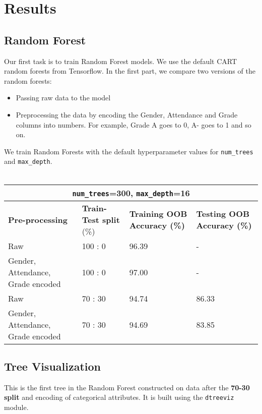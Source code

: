\section{Results}
\subsection{Random Forest}
Our first task is to train Random Forest models. We use the default CART random forests from Tensorflow. In the first part, we compare two versions of the random forests:

\begin{itemize}
    \item Passing raw data to the model
    \item Preprocessing the data by encoding the Gender, Attendance and Grade columns into numbers. For example, Grade A goes to 0, A- goes to 1 and so on.
\end{itemize}


We train Random Forests with the default hyperparameter values for \texttt{num\_trees} and \texttt{max\_depth}.\\\\

\begin{tabular}{|p{4cm}||p{2 cm}||p{3cm}||p{3cm}|}
\hline
\multicolumn{4}{|c|}{\texttt{num\_trees}=300, \texttt{max\_depth}=16}\\
\hline
\textbf{Pre-processing} & \textbf{Train-Test split} (\%) &\textbf{Training OOB Accuracy (\%)} & \textbf{Testing OOB Accuracy (\%)} \\
\hline
Raw & 100 : 0& 96.39& -\\
\hline
Gender, Attendance, Grade encoded & 100 : 0  & 97.00&- \\
\hline
Raw & 70 : 30&  94.74& 86.33 \\
\hline
Gender, Attendance, Grade encoded & 70 : 30  &94.69 & 83.85 \\
\hline
\end{tabular}\newline


\subsection{Tree Visualization}

This is the first tree in the Random Forest constructed on data after the \textbf{70-30 split} and encoding of categorical attributes. It is built using the \texttt{dtreeviz} module.


\newpage
